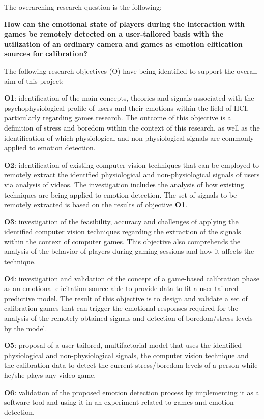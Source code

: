 The overarching research question is the following:

\textbf{How can the emotional state of players during the interaction with games be remotely detected on a user-tailored basis with the utilization of an ordinary camera and games as emotion elitication sources for calibration?}

The following research objectives (O) have being identified to support the overall aim of this project:

\textbf{O1}: identification of the main concepts, theories and signals associated with the psychophysiological profile of users and their emotions within the field of HCI, particularly regarding games research. The outcome of this objective is a definition of stress and boredom within the context of this research, as well as the identification of which physiological and non-physiological signals are commonly applied to emotion detection.

\textbf{O2}: identification of existing computer vision techniques that can be employed to remotely extract the identified physiological and non-physiological signals of users via analysis of videos. The investigation includes the analysis of how existing techniques are being applied to emotion detection. The set of signals to be remotely extracted is based on the results of objective \textbf{O1}.

\textbf{O3}: investigation of the feasibility, accuracy and challenges of applying the identified computer vision techniques regarding the extraction of the signals within the context of computer games. This objective also comprehends the analysis of the behavior of players during gaming sessions and how it affects the technique.

\textbf{O4}: investigation and validation of the concept of a game-based calibration phase as an emotional elicitation source able to provide data to fit a user-tailored predictive model. The result of this objective is to design and validate a set of calibration games that can trigger the emotional responses required for the analysis of the remotely obtained signals and detection of boredom/stress levels by the model.

\textbf{O5}: proposal of a user-tailored, multifactorial model that uses the identified physiological and non-physiological signals, the computer vision technique and the calibration data to detect the current stress/boredom levels of a person while he/she plays any video game.

\textbf{O6}: validation of the proposed emotion detection process by implementing it as a software tool and using it in an experiment related to games and emotion detection.

